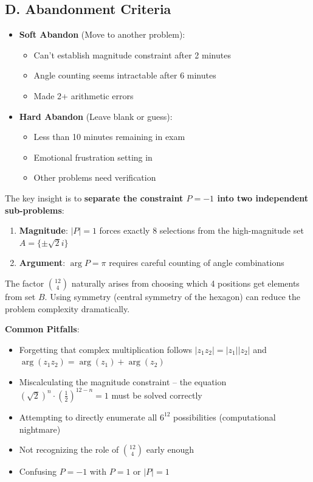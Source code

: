 \documentclass[]{article}
\begin{document}
\begin{competitionbox}
\subsection*{D. Abandonment Criteria}
\begin{itemize}[leftmargin=*]
    \item \textbf{Soft Abandon} (Move to another problem):
    \begin{itemize}
        \item Can't establish magnitude constraint after 2 minutes
        \item Angle counting seems intractable after 6 minutes  
        \item Made 2+ arithmetic errors
    \end{itemize}
    \item \textbf{Hard Abandon} (Leave blank or guess):
    \begin{itemize}
        \item Less than 10 minutes remaining in exam
        \item Emotional frustration setting in
        \item Other problems need verification
    \end{itemize}
\end{itemize}
\end{competitionbox}

\begin{keyinsightbox}
The key insight is to \textbf{separate the constraint $P = -1$ into two independent sub-problems}:
\begin{enumerate}
    \item \textbf{Magnitude}: $|P| = 1$ forces exactly 8 selections from the high-magnitude set $A = \{\pm\sqrt{2}i\}$
    \item \textbf{Argument}: $\arg P = \pi$ requires careful counting of angle combinations
\end{enumerate}

The factor $\binom{12}{4}$ naturally arises from choosing which 4 positions get elements from set $B$. Using symmetry (central symmetry of the hexagon) can reduce the problem complexity dramatically.
\end{keyinsightbox}

\begin{warningbox}
\textbf{Common Pitfalls}:
\begin{itemize}
    \item Forgetting that complex multiplication follows $|z_1 z_2| = |z_1||z_2|$ and $\arg(z_1 z_2) = \arg(z_1) + \arg(z_2)$
    \item Miscalculating the magnitude constraint -- the equation $(\sqrt{2})^n \cdot (\frac{1}{2})^{12-n} = 1$ must be solved correctly
    \item Attempting to directly enumerate all $6^{12}$ possibilities (computational nightmare)
    \item Not recognizing the role of $\binom{12}{4}$ early enough
    \item Confusing $P = -1$ with $P = 1$ or $|P| = 1$
\end{itemize}
\end{warningbox}
\end{document}
